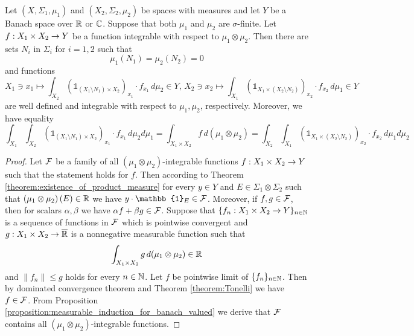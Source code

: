 \begin{theorem}[Fubini]\label{theorem:fubini}
    Let $(X,\Sigma_1,\mu_1)$ and $(X_2,\Sigma_2,\mu_2)$ be spaces with measures and let $Y$ be a Banach space over ${\mathbb R}$ or ${\mathbb C}$. Suppose that both $\mu_1$ and $\mu_2$ are $\sigma$-finite. Let $f:X_1\times X_2\rightarrow Y$ be a function integrable with respect to $\mu_1\otimes \mu_2$. Then there are sets $N_i$ in $\Sigma_i$ for $i=1,2$ such that
    $$\mu_1(N_1) = \mu_2(N_2) = 0$$
    and functions
    $$X_1 \ni x_1\mapsto \int_{X_2}\left(\mathbb{1}_{\left(X_1\setminus N_1\right)\times X_2}\right)_{x_1}\cdot f_{x_1}\,d\mu_2\in Y,\,X_2 \ni x_2\mapsto \int_{X_1}\left(\mathbb{1}_{X_1\times \left(X_2\setminus N_2\right)}\right)_{x_2}\cdot f_{x_2}\,d\mu_1\in Y$$
    are well defined and integrable with respect to $\mu_1, \mu_2$, respectively. Moreover, we have equality
    $$\int_{X_1}\int_{X_2} \left(\mathbb{1}_{\left(X_1\setminus N_1\right)\times X_2}\right)_{x_1}\cdot f_{x_1}\,d\mu_2d\mu_1 = \int_{X_1\times X_2}f\,d(\mu_1\otimes \mu_2) = \int_{X_2}\int_{X_1} \left(\mathbb{1}_{X_1\times \left(X_2\setminus N_2\right)}\right)_{x_2}\cdot f_{x_2}\,d\mu_1d\mu_2$$
\end{theorem}
\begin{proof}
    Let ${\mathcal F}$ be a family of all $\left(\mu_1\otimes \mu_2\right)$-integrable functions $f:X_1\times X_2\rightarrow Y$ such that the statement holds for $f$. Then according to Theorem \ref{theorem:existence_of_product_measure} for every $y\in Y$ and $E\in \Sigma_1\otimes \Sigma_2$ such that $\left(\mu_1\otimes \mu_2\right)(E) \in {\mathbb R}$ we have $y\cdot \mathbb{1}_E \in \cF$. Moreover, if $f, g\in {\mathcal F}$, then for scalars $\alpha,\beta$ we have $\alpha f + \beta g\in {\mathcal F}$. Suppose that $\{f_n:X_1\times X_2\rightarrow Y\}_{n\in {\mathbb N}}$ is a sequence of functions in ${\mathcal F}$ which is pointwise convergent and $g:X_1\times X_2\rightarrow \overline{{\mathbb R}}$ is a nonnegative measurable function such that
    $$\int_{X_1\times X_2}g\,d(\mu_1\otimes \mu_2) \in {\mathbb R}$$
    and $\lVert f_n\rVert \leq g$ holds for every $n\in {\mathbb N}$. Let $f$ be pointwise limit of $\{f_n\}_{n\in {\mathbb N}}$. Then by dominated convergence theorem and Theorem \ref{theorem:Tonelli} we have $f\in {\mathcal F}$. From Proposition \ref{proposition:measurable_induction_for_banach_valued} we derive that ${\mathcal F}$ contains all $\left(\mu_1\otimes \mu_2\right)$-integrable functions.
\end{proof}


\small




